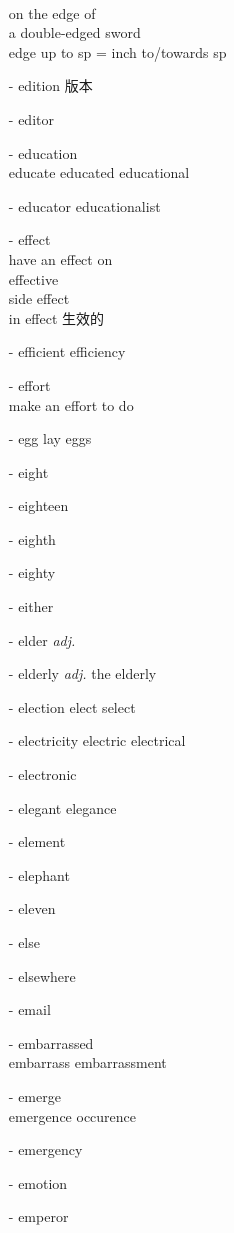 \documentclass[../../book.tex]{subfiles}
\begin{document}
\begin{multicols}{2}
\begin{itemize}
\\on the edge of
\\a double-edged sword
\\edge up to sp = inch to/towards sp
\item[-] edition 版本
\item[-] editor
\item[-] education
\\educate educated educational
\item[-] educator \phantom{a} educationalist
\item[-] effect
\\have an effect on
\\effective
\\side effect
\\in effect 生效的
\item[-] efficient \phantom{a} efficiency
\item[-] effort
\\make an effort to do
\item[-] egg \phantom{a} lay eggs
\item[-] eight
\item[-] eighteen
\item[-] eighth
\item[-] eighty
\item[-] either
\item[-] elder \emph{adj.}
\item[-] elderly \emph{adj.} \phantom{a} the elderly
\item[-] election \phantom{a} elect \phantom{a} {\color{violet}select}
\item[-] electricity \phantom{a} electric electrical
\item[-] electronic
\item[-] elegant \phantom{a} elegance
\item[-] element
\item[-] elephant
\item[-] eleven
\item[-] else
\item[-] elsewhere
\item[-] email
\item[-] embarrassed
\\embarrass embarrassment
\item[-] emerge
\\emergence \phantom{a} {\color{violet}occurence}
\item[-] emergency
\item[-] emotion
\item[-] emperor

\end{itemize}
\end{multicols}
\end{document}
